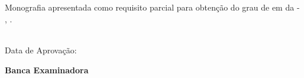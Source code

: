 %
%

\makeatletter
\begin{folhadeaprovacao}

\thispagestyle{empty}%
	
	\begin{center}
    
		\imprimirnomeautor\\
		\vspace*{3.1 cm}%
		\imprimirtitulotb\\
		
    \end{center}
	
	\vspace*{0.35 cm}%
		    \large%
    		\hfill%
	    	\begin{minipage}{8 cm}%
	    		\begin{small} %
	    		\setlength{\baselineskip}{0.7\baselineskip}
				
		    	{Monografia apresentada como requisito parcial para obtenção do grau de
		    	{\imprimirgrau } em {\imprimirprograma } da {\imprimirinstituicao}{ - }{\imprimirabreviatura},
		    	{\imprimirdepartamento}.}\\{
		    	}\\				
				
				\end{small} %
		    \end{minipage}%
		    	
		    \vspace*{0.6 cm}%
		    
		    \large%
    		\hfill%
	    	 
		    
		    \normalsize %
		    \vspace*{1.5 cm}%
		    
		    \begin{minipage}{9 cm }%
		    {Data de Aprovação: {\imprimirdataapresentacao}}\\
		    \end{minipage}%
			
			\begin{center}%
		    	\vspace*{1.21 cm}%
				\textbf{Banca Examinadora}\\ %
						

\end{center}
\end{folhadeaprovacao}
